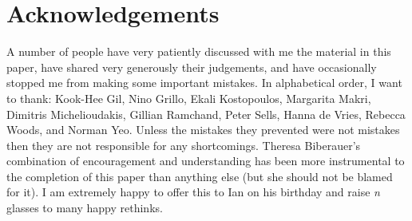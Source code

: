 \documentclass[output=paper]{langsci/langscibook}
\begin{document}
\printchapterglossary{}

\section*{Acknowledgements}

A number of people have very patiently discussed with me the material in this
paper, have shared very generously their judgements, and have occasionally
stopped me from making some important mistakes. In alphabetical order, I want
to thank: Kook-Hee Gil, Nino Grillo, Ekali Kostopoulos, Margarita Makri,
Dimitris Michelioudakis, Gillian Ramchand, Peter Sells, Hanna de Vries, Rebecca
Woods, and Norman Yeo. Unless the mistakes they prevented were not mistakes
then they are not responsible for any shortcomings. Theresa Biberauer’s
combination of encouragement and understanding has been more instrumental to
the completion of this paper than anything else (but she should not be blamed
for it). I am extremely happy to offer this to Ian on his birthday and raise
\emph{n} glasses to many happy rethinks.

{\sloppy
\printbibliography[heading=subbibliography,notkeyword=this]
}
\end{document}
